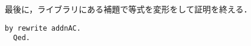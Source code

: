 最後に，ライブラリにある補題で等式を変形をして証明を終える．
\begin{lstlisting}[language=Coq]
    by rewrite addnAC.
  Qed.
\end{lstlisting}

